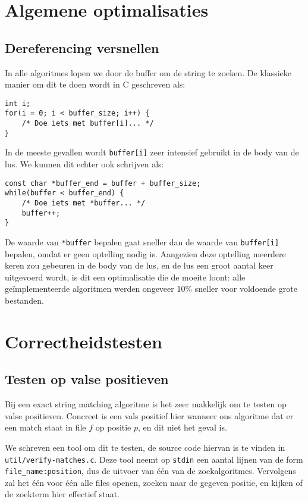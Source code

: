 \documentclass[a4paper,11pt]{article}
\begin{document}
\section{Algemene optimalisaties}

\subsection{Dereferencing versnellen}

In alle algoritmes lopen we door de buffer om de string te zoeken. De klassieke
manier om dit te doen wordt in C geschreven als:

\begin{verbatim}
int i;
for(i = 0; i < buffer_size; i++) {
    /* Doe iets met buffer[i]... */
}
\end{verbatim}

In de meeste gevallen wordt \verb#buffer[i]# zeer intensief gebruikt in de body
van de lus. We kunnen dit echter ook schrijven als:

\begin{verbatim}
const char *buffer_end = buffer + buffer_size;
while(buffer < buffer_end) {
    /* Doe iets met *buffer... */
    buffer++;
}
\end{verbatim}

De waarde van \verb#*buffer# bepalen gaat sneller dan de waarde van
\verb#buffer[i]# bepalen, omdat er geen optelling nodig is. Aangezien deze
optelling meerdere keren zou gebeuren in de body van de lus, en de lus een groot
aantal keer uitgevoerd wordt, is dit een optimalisatie die de moeite loont: alle
ge\"implementeerde algoritmen werden ongeveer 10\% sneller voor voldoende grote
bestanden.

\section{Correctheidstesten}

\subsection{Testen op valse positieven}

Bij een exact string matching algoritme is het zeer makkelijk om te testen op
valse positieven. Concreet is een vals positief hier wanneer ons algoritme dat
er een match staat in file $f$ op positie $p$, en dit niet het geval is.

We schreven een tool om dit te testen, de source code hiervan is te vinden in
\verb#util/verify-matches.c#. Deze tool neemt op \verb#stdin# een aantal lijnen
van de form \verb#file_name:position#, dus de uitvoer van \'e\'en van de
zoekalgoritmes. Vervolgens zal het \'e\'en voor \'e\'en alle files openen,
zoeken naar de gegeven positie, en kijken of de zoekterm hier effectief staat.
\end{document}
